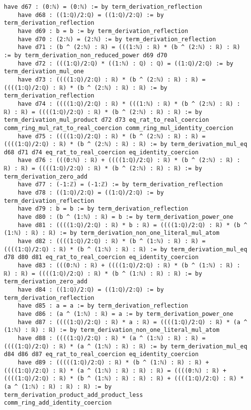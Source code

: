 \documentclass{article}
\begin{document}
\begin{tcolorbox}[colback=white!10, width=\linewidth]
\begin{lstlisting}[language=Lean4]
    have d67 : (0:ℕ) = (0:ℕ) := by term_derivation_reflection
    have d68 : ((1:ℚ)/2:ℚ) = ((1:ℚ)/2:ℚ) := by term_derivation_reflection
    have d69 : b = b := by term_derivation_reflection
    have d70 : (2:ℕ) = (2:ℕ) := by term_derivation_reflection
    have d71 : (b ^ (2:ℕ) : ℝ) = (((1:ℕ) : ℝ) * (b ^ (2:ℕ) : ℝ) : ℝ) := by term_derivation_non_reduced_power d69 d70
    have d72 : (((1:ℚ)/2:ℚ) * ((1:ℕ) : ℚ) : ℚ) = ((1:ℚ)/2:ℚ) := by term_derivation_mul_one
    have d73 : ((((1:ℚ)/2:ℚ) : ℝ) * (b ^ (2:ℕ) : ℝ) : ℝ) = ((((1:ℚ)/2:ℚ) : ℝ) * (b ^ (2:ℕ) : ℝ) : ℝ) := by term_derivation_reflection
    have d74 : ((((1:ℚ)/2:ℚ) : ℝ) * (((1:ℕ) : ℝ) * (b ^ (2:ℕ) : ℝ) : ℝ) : ℝ) = ((((1:ℚ)/2:ℚ) : ℝ) * (b ^ (2:ℕ) : ℝ) : ℝ) := by term_derivation_mul_product d72 d73 eq_rat_to_real_coercion comm_ring_mul_rat_to_real_coercion comm_ring_mul_identity_coercion
    have d75 : ((((1:ℚ)/2:ℚ) : ℝ) * (b ^ (2:ℕ) : ℝ) : ℝ) = ((((1:ℚ)/2:ℚ) : ℝ) * (b ^ (2:ℕ) : ℝ) : ℝ) := by term_derivation_mul_eq d68 d71 d74 eq_rat_to_real_coercion eq_identity_coercion
    have d76 : (((0:ℕ) : ℝ) + ((((1:ℚ)/2:ℚ) : ℝ) * (b ^ (2:ℕ) : ℝ) : ℝ) : ℝ) = ((((1:ℚ)/2:ℚ) : ℝ) * (b ^ (2:ℕ) : ℝ) : ℝ) := by term_derivation_zero_add
    have d77 : (-1:ℤ) = (-1:ℤ) := by term_derivation_reflection
    have d78 : ((1:ℚ)/2:ℚ) = ((1:ℚ)/2:ℚ) := by term_derivation_reflection
    have d79 : b = b := by term_derivation_reflection
    have d80 : (b ^ (1:ℕ) : ℝ) = b := by term_derivation_power_one
    have d81 : ((((1:ℚ)/2:ℚ) : ℝ) * b : ℝ) = ((((1:ℚ)/2:ℚ) : ℝ) * (b ^ (1:ℕ) : ℝ) : ℝ) := by term_derivation_non_one_literal_mul_atom
    have d82 : ((((1:ℚ)/2:ℚ) : ℝ) * (b ^ (1:ℕ) : ℝ) : ℝ) = ((((1:ℚ)/2:ℚ) : ℝ) * (b ^ (1:ℕ) : ℝ) : ℝ) := by term_derivation_mul_eq d78 d80 d81 eq_rat_to_real_coercion eq_identity_coercion
    have d83 : (((0:ℕ) : ℝ) + ((((1:ℚ)/2:ℚ) : ℝ) * (b ^ (1:ℕ) : ℝ) : ℝ) : ℝ) = ((((1:ℚ)/2:ℚ) : ℝ) * (b ^ (1:ℕ) : ℝ) : ℝ) := by term_derivation_zero_add
    have d84 : ((1:ℚ)/2:ℚ) = ((1:ℚ)/2:ℚ) := by term_derivation_reflection
    have d85 : a = a := by term_derivation_reflection
    have d86 : (a ^ (1:ℕ) : ℝ) = a := by term_derivation_power_one
    have d87 : ((((1:ℚ)/2:ℚ) : ℝ) * a : ℝ) = ((((1:ℚ)/2:ℚ) : ℝ) * (a ^ (1:ℕ) : ℝ) : ℝ) := by term_derivation_non_one_literal_mul_atom
    have d88 : ((((1:ℚ)/2:ℚ) : ℝ) * (a ^ (1:ℕ) : ℝ) : ℝ) = ((((1:ℚ)/2:ℚ) : ℝ) * (a ^ (1:ℕ) : ℝ) : ℝ) := by term_derivation_mul_eq d84 d86 d87 eq_rat_to_real_coercion eq_identity_coercion
    have d89 : (((((1:ℚ)/2:ℚ) : ℝ) * (b ^ (1:ℕ) : ℝ) : ℝ) + ((((1:ℚ)/2:ℚ) : ℝ) * (a ^ (1:ℕ) : ℝ) : ℝ) : ℝ) = ((((0:ℕ) : ℝ) + ((((1:ℚ)/2:ℚ) : ℝ) * (b ^ (1:ℕ) : ℝ) : ℝ) : ℝ) + ((((1:ℚ)/2:ℚ) : ℝ) * (a ^ (1:ℕ) : ℝ) : ℝ) : ℝ) := by term_derivation_product_add_product_less comm_ring_add_identity_coercion

\end{lstlisting}
\end{tcolorbox}
\end{document}
